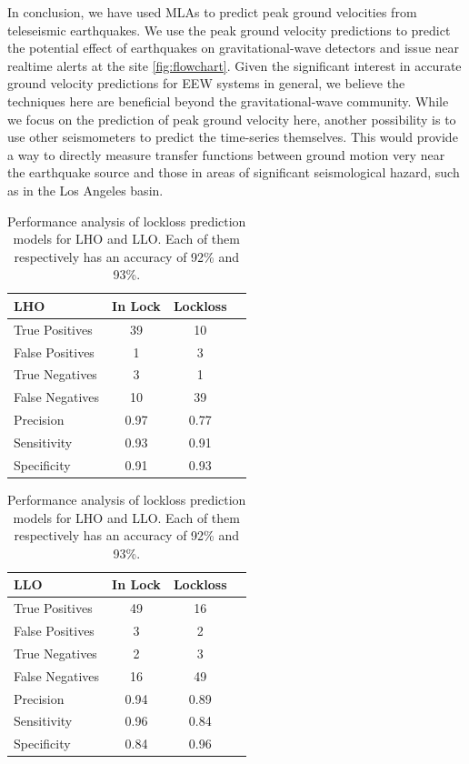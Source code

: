 \documentclass[preprint, aps, showpacs]{revtex4-1}
\begin{document}
In conclusion, we have used MLAs to predict peak ground velocities from teleseismic earthquakes.
We use the peak ground velocity predictions to predict the potential effect of earthquakes on gravitational-wave detectors and issue near realtime alerts at the site \ref{fig:flowchart}.
Given the significant interest in accurate ground velocity predictions for EEW systems in general, we believe the techniques here are beneficial beyond the gravitational-wave community.
While we focus on the prediction of peak ground velocity here, another possibility is to use other seismometers to predict the time-series themselves.
This would provide a way to directly measure transfer functions between ground motion very near the earthquake source and those in areas of significant seismological hazard, such as in the Los Angeles basin.


\begin{table}[!htb]
    \centering
    \begin{minipage}{.45\textwidth}

        \centering

 \begin{tabular}{  | l | c | c | r   } 
 \hline 
\textbf{LHO} & In Lock & Lockloss  \\ 
\hline 
True Positives           & 39 & 10  \\ 
False Positives            & 1 & 3 \\ 
True Negatives          & 3 & 1  \\ 
 False Negatives          & 10 & 39   \\ 
  \hline 
Precision      & 0.97 & 0.77 \\  
Sensitivity     & 0.93& 0.91 \\   
Specificity    & 0.91 & 0.93 \\   
\hline                 
\end{tabular} 
 
    \end{minipage}%
    \begin{minipage}{0.45\textwidth}
        \centering

\begin{tabular}{  | l | c | c | r   } 
 \hline 
\textbf{LLO} & In Lock & Lockloss  \\ 
\hline 
True Positives           & 49 & 16  \\ 
False Positives           & 3 & 2 \\ 
True Negatives          & 2 & 3  \\ 
 False Negatives          & 16 & 49   \\ 
   \hline 
Precision      & 0.94 & 0.89 \\  
Sensitivity      & 0.96& 0.84 \\   
Specificity    & 0.84 & 0.96 \\   
\hline                 
\end{tabular} 


    \end{minipage}
\caption{Performance analysis of lockloss prediction models for LHO and LLO. Each of them respectively has an accuracy of 92\% and 93\%.}    
\end{table}
\end{document}
